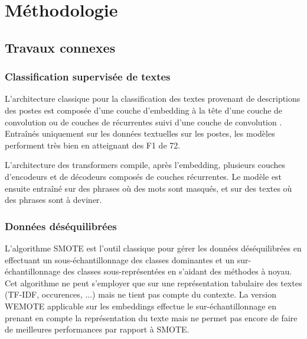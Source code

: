 \chapter{Méthodologie}

\section{Travaux connexes}
\subsection{Classification supervisée de textes}
L'architecture classique pour la classification des textes provenant de descriptions des postes est composée d'une couche d'embedding à la tête d'une couche de convolution  ou de couches de récurrentes suivi d'une couche de convolution . Entraînés uniquement sur les données textuelles sur les postes, les modèles performent très bien en atteignant des F1 de \textsf{72}.

L'architecture des transformers  compile, après l'embedding, plusieurs couches d'encodeurs et de décodeurs composés de couches récurrentes. Le modèle est ensuite entraîné sur des phrases où des mots sont masqués, et sur des textes où des phrases sont à deviner.

\subsection{Données déséquilibrées}
L'algorithme SMOTE  est l'outil classique pour gérer les données déséquilibrées en effectuant un sous-échantillonnage des classes dominantes et un sur-échantillonnage des classes sous-représentées en s'aidant des méthodes à noyau. Cet algorithme ne peut s'employer que sur une représentation tabulaire des textes (TF-IDF, occurences, ...) mais ne tient pas compte du contexte. La version WEMOTE  applicable sur les embeddings effectue le sur-échantillonnage en prenant en compte la représentation du texte mais ne permet pas encore de faire de meilleures performances par rapport à SMOTE.

